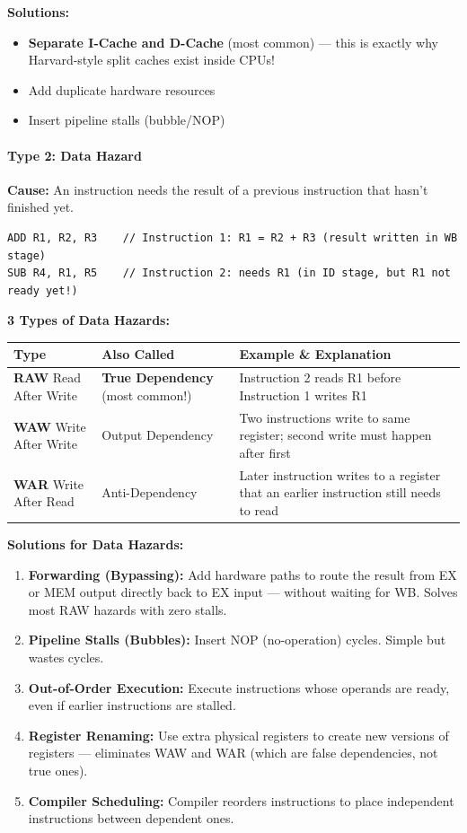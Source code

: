 \documentclass[11pt,a4paper]{article}
\newcommand{\term}[1]{\textbf{\color{darkblue}#1}}
\begin{document}
\textbf{Solutions:}
\begin{itemize}[noitemsep]
  \item \textbf{Separate I-Cache and D-Cache} (most common) --- this is exactly why Harvard-style split caches exist inside CPUs!
  \item Add duplicate hardware resources
  \item Insert pipeline stalls (bubble/NOP)
\end{itemize}

\paragraph{Type 2: Data Hazard}

\textbf{Cause:} An instruction needs the result of a previous instruction that hasn't finished yet.

\begin{lstlisting}
ADD R1, R2, R3    // Instruction 1: R1 = R2 + R3 (result written in WB stage)
SUB R4, R1, R5    // Instruction 2: needs R1 (in ID stage, but R1 not ready yet!)
\end{lstlisting}

\textbf{3 Types of Data Hazards:}
\begin{center}
\begin{tabular}{L{3.5cm} L{4.5cm} L{6cm}}
\toprule
\textbf{Type} & \textbf{Also Called} & \textbf{Example \& Explanation} \\
\midrule
\term{RAW} Read After Write & \textbf{True Dependency} (most common!) & Instruction 2 reads R1 before Instruction 1 writes R1 \\[4pt]
\term{WAW} Write After Write & Output Dependency & Two instructions write to same register; second write must happen after first \\[4pt]
\term{WAR} Write After Read & Anti-Dependency & Later instruction writes to a register that an earlier instruction still needs to read \\
\bottomrule
\end{tabular}
\end{center}

\textbf{Solutions for Data Hazards:}

\begin{enumerate}[noitemsep]
  \item \term{Forwarding (Bypassing):} Add hardware paths to route the result from EX or MEM output directly back to EX input --- without waiting for WB. Solves most RAW hazards with zero stalls.
  \item \term{Pipeline Stalls (Bubbles):} Insert NOP (no-operation) cycles. Simple but wastes cycles.
  \item \term{Out-of-Order Execution:} Execute instructions whose operands are ready, even if earlier instructions are stalled.
  \item \term{Register Renaming:} Use extra physical registers to create new versions of registers --- eliminates WAW and WAR (which are false dependencies, not true ones).
  \item \term{Compiler Scheduling:} Compiler reorders instructions to place independent instructions between dependent ones.
\end{enumerate}
\end{document}
